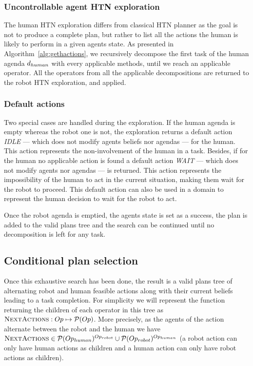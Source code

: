 \documentclass[a4paper,11pt,twoside]{StyleThese}
\begin{document}
\subsubsection{Uncontrollable agent HTN exploration}
The human HTN exploration differs from classical HTN planner as the goal is not to produce a complete plan, but rather to list all the actions the human is likely to perform in a given agents state. As presented in Algorithm~\ref{alg:gethactions}, we recursively decompose the first task of the human agenda $d_{human}$ with every applicable methods, until we reach an applicable operator. All the operators from all the applicable decompositions are returned to the robot HTN exploration, and applied.

\subsubsection{Default actions} Two special cases are handled during the exploration. If the human agenda is empty whereas the robot one is not, the exploration returns a default action \textit{IDLE} --- which does not modify agents beliefs nor agendas --- for the human. This action represents the non-involvement of the human in a task. Besides, if for the human no applicable action is found a default action \textit{WAIT} --- which does not modify agents nor agendas --- is returned. This action represents the impossibility of the human to act in the current situation, making them wait for the robot to proceed. This default action can also be used in a domain to represent the human decision to wait for the robot to act.

Once the robot agenda is emptied, the agents state is set as a success, the plan is added to the valid plans tree and the search can be continued until no decomposition is left for any task.


\subsection{Conditional plan selection}
Once this exhaustive search has been done, the result is a valid plans tree of alternating robot and human feasible actions along with their current beliefs leading to a task completion. For simplicity we will represent the function returning the children of each operator in this tree as $\textsc{NextActions}: Op \mapsto \mathcal{P}(Op)$. More precisely, as the agents of the action alternate between the robot and the human we have $\textsc{NextActions} \in \mathcal{P}(Op_{human})^{Op_{robot}} \cup \mathcal{P}(Op_{robot})^{Op_{human}}$ (a robot action can only have human actions as children and a human action can only have robot actions as children). 
\end{document}
